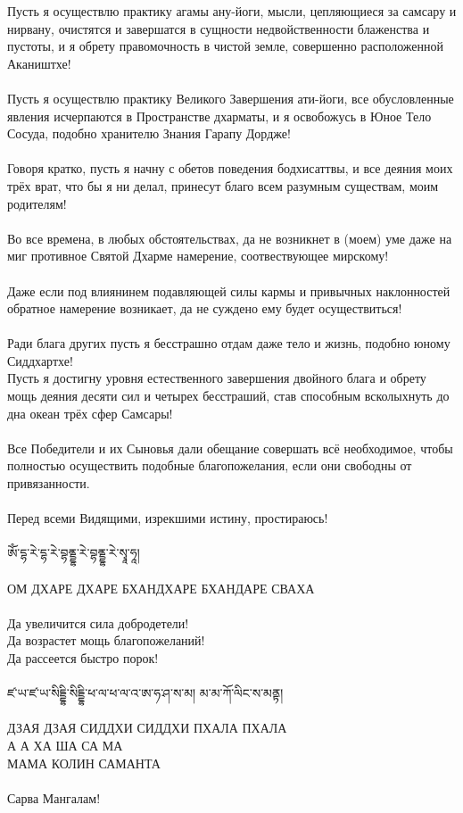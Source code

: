 Пусть я осуществлю практику агамы ану-йоги, мысли,
цепляю\-щиеся за самсару и нирвану, очистятся и завершатся
в сущности недвойственности блаженства и пустоты,
и я обрету правомочность в чистой земле,
совершенно расположенной Акаништхе!\\
\\
Пусть я осуществлю практику Великого Завершения ати-йоги,
все обусловленные явления исчерпаются в Пространстве дхарматы,
и я освобожусь в Юное Тело Сосуда, подобно хранителю
Знания Гарапу Дордже!\\
\\
Говоря кратко, пусть я начну с обетов поведения бодхисаттвы,
и все деяния моих трёх врат, что бы я ни делал,
принесут благо всем разумным существам, моим родителям!\\
\\
Во все времена, в любых обстоятельствах, да не возникнет
в (моем) уме даже на миг противное Святой Дхарме намерение,
соотвествующее мирскому!\\
\\
Даже если под влиянинем подавляющей силы кармы и
привыч\-ных наклонностей обратное намерение возникает,
да не сужде\-но ему будет осуществиться!\\
\\
Ради блага других пусть я бесстрашно отдам даже тело и жизнь,
подобно юному Сиддхартхе!\\
\newpage
Пусть я достигну уровня естественного завершения двойного блага
и обрету мощь деяния десяти сил и четырех бесстраший,
став способным всколыхнуть до дна океан трёх сфер Самсары!\\
\\
Все Победители и их Сыновья дали обещание совершать всё
необходимое, чтобы полностью осуществить подобные благопожелания,
если они свободны от привязанности.\\
\\
Перед всеми Видящими, изрекшими истину, простираюсь!
\\
\ti
\\
ཨོཾ་དྷ་རེ་དྷ་རེ་བྷནྡྷ་རེ་བྷནྡྷ་རེ་སྭཱ་ཧཱ། \\
\ru
\\
ОМ ДХАРЕ ДХАРЕ БХАНДХАРЕ БХАНДАРЕ СВАХА\\
\\
\noindent
Да увеличится сила добродетели!\\
Да возрастет мощь благопожеланий!\\
Да рассеется быстро порок!\\
\ti \\ ཛ་ཡ་ཛ་ཡ་སིདྡྷི་སིདྡྷི་ཕ་ལ་ཕ་ལ་འ་ཨ་ཧ་ཤ་ས་མ། མ་མ་ཀོ་ལིང་ས་མནྟ། \\
\ru \\ ДЗАЯ ДЗАЯ СИДДХИ СИДДХИ ПХАЛА ПХАЛА\\
А А ХА ША СА МА\\
МАМА КОЛИН САМАНТА\\
\\
\scriptsize
\ru Сарва Мангалам!
\normalsize
